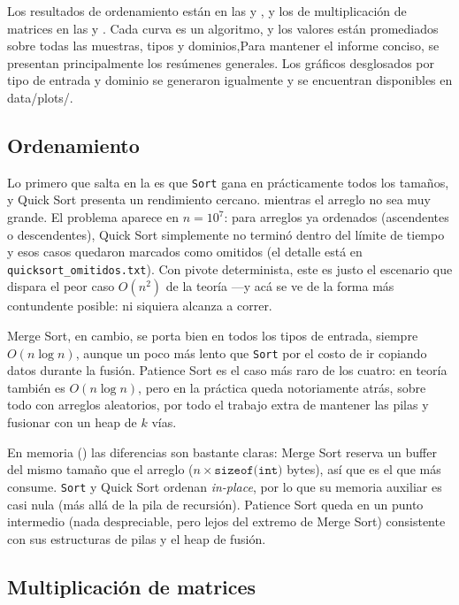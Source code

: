Los resultados de ordenamiento están en las  y
, y los de multiplicación de matrices en las
 y . Cada curva es un
algoritmo, y los valores están promediados sobre todas las muestras,
tipos y dominios,Para mantener el informe conciso, se presentan principalmente 
los resúmenes generales. Los gráficos desglosados por tipo de entrada y dominio 
se generaron igualmente y se encuentran disponibles en data/plots/.

\subsection{Ordenamiento}

Lo primero que salta en la  es que
\texttt{Sort} gana en prácticamente todos los tamaños, y Quick Sort presenta 
un rendimiento cercano. mientras el arreglo no sea muy grande. El
problema aparece en $n=10^7$: para arreglos ya ordenados (ascendentes o
descendentes), Quick Sort simplemente no terminó dentro del límite de
tiempo y esos casos quedaron marcados como omitidos (el detalle está en
\texttt{quicksort\_omitidos.txt}). Con pivote determinista, este es
justo el escenario que dispara el peor caso $O(n^2)$ de la teoría —y
acá se ve de la forma más contundente posible: ni siquiera alcanza a
correr.

Merge Sort, en cambio, se porta bien en todos los tipos de entrada,
siempre $O(n\log n)$, aunque un poco más lento que \texttt{Sort}
por el costo de ir copiando datos durante la fusión. Patience Sort es
el caso más raro de los cuatro: en teoría también es $O(n\log n)$, pero
en la práctica queda notoriamente atrás, sobre todo con arreglos
aleatorios, por todo el trabajo extra de mantener las pilas y fusionar
con un heap de $k$ vías.

En memoria () las diferencias son bastante
claras: Merge Sort reserva un buffer del mismo tamaño que el arreglo
($n\times\texttt{sizeof(int)}$ bytes), así que es el que más consume.
\texttt{Sort} y Quick Sort ordenan \textit{in-place}, por lo que
su memoria auxiliar es casi nula (más allá de la pila de recursión).
Patience Sort queda en un punto intermedio (nada despreciable, pero
lejos del extremo de Merge Sort) consistente con sus estructuras de
pilas y el heap de fusión.

\subsection{Multiplicación de matrices}

